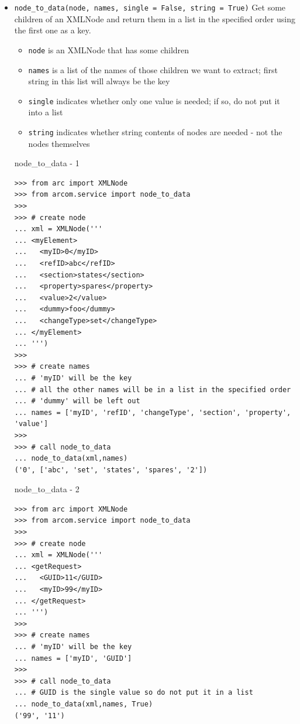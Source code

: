 \documentclass{article}
\begin{document}
\begin{flushleft}
\begin{itemize}
  \item{ \verb$node_to_data(node, names, single = False, string = True)$ \linebreak
  Get some children of an XMLNode and return them in a list in the specified order using the first one as a key.
  \begin{itemize}
    \item{\verb$node$ is an XMLNode that has some children}
    \item{\verb$names$ is a list of the names of those children we want to extract; first string in this list will always be the key}
    \item{\verb$single$ indicates whether only one value is needed; if so, do not put it into a list}
    \item{\verb$string$ indicates whether string contents of nodes are needed - not the nodes themselves}
  \end{itemize}  
    \begin{example}
      \caption{node\_to\_data - 1}\label{n2dex1}
\begin{verbatim}
>>> from arc import XMLNode
>>> from arcom.service import node_to_data
>>> 
>>> # create node
... xml = XMLNode('''
... <myElement>
...   <myID>0</myID>
...   <refID>abc</refID>
...   <section>states</section>
...   <property>spares</property>
...   <value>2</value>
...   <dummy>foo</dummy>
...   <changeType>set</changeType>
... </myElement>
... ''')
>>> 
>>> # create names
... # 'myID' will be the key
... # all the other names will be in a list in the specified order
... # 'dummy' will be left out
... names = ['myID', 'refID', 'changeType', 'section', 'property', 'value']
>>> 
>>> # call node_to_data
... node_to_data(xml,names)
('0', ['abc', 'set', 'states', 'spares', '2'])
\end{verbatim}
    \end{example}
    \begin{example}
      \caption{node\_to\_data - 2}\label{n2dex2}
\begin{verbatim}
>>> from arc import XMLNode
>>> from arcom.service import node_to_data
>>> 
>>> # create node
... xml = XMLNode('''
... <getRequest>
...   <GUID>11</GUID>
...   <myID>99</myID>
... </getRequest>
... ''')
>>> 
>>> # create names
... # 'myID' will be the key
... names = ['myID', 'GUID']
>>> 
>>> # call node_to_data
... # GUID is the single value so do not put it in a list
... node_to_data(xml,names, True)
('99', '11')
\end{verbatim}
    \end{example}
  }
\end{itemize}


\end{flushleft}
\end{document}
